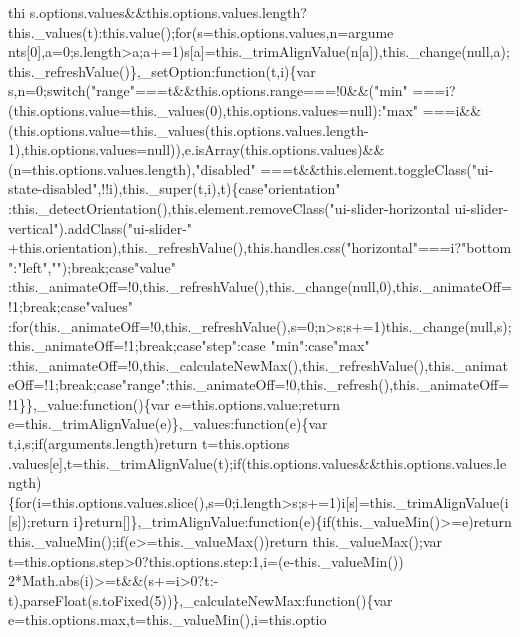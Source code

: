 \begin{DoxyCode}
{       thi
      s.options.values&&this.options.values.length?this.\_values(t):this.value();for(s=this.options.values,n=argume
      nts[0],a=0;s.length>a;a+=1)s[a]=this.\_trimAlignValue(n[a]),this.\_change(null,a);this.\_refreshValue()\},\_setOption:function(t,i)\{var s,n=0;switch("}range\textcolor{stringliteral}{"===t&&this.options.range===!0&&("}min\textcolor{stringliteral}{"
      ===i?(this.options.value=this.\_values(0),this.options.values=null):"}max\textcolor{stringliteral}{"
      ===i&&(this.options.value=this.\_values(this.options.values.length-1),this.options.values=null)),e.isArray(this.options.values)&&(n=this.options.values.length),"}disabled\textcolor{stringliteral}{"
      ===t&&this.element.toggleClass("}ui-state-disabled\textcolor{stringliteral}{",!!i),this.\_super(t,i),t)\{case"}orientation\textcolor{stringliteral}{"
      :this.\_detectOrientation(),this.element.removeClass("}ui-slider-horizontal ui-slider-vertical\textcolor{stringliteral}{").addClass("}ui-slider-\textcolor{stringliteral}{"
      +this.orientation),this.\_refreshValue(),this.handles.css("}horizontal\textcolor{stringliteral}{"===i?"}bottom\textcolor{stringliteral}{":"}left\textcolor{stringliteral}{","}\textcolor{stringliteral}{");break;case"}value\textcolor{stringliteral}{"
      :this.\_animateOff=!0,this.\_refreshValue(),this.\_change(null,0),this.\_animateOff=!1;break;case"}values\textcolor{stringliteral}{"
      :for(this.\_animateOff=!0,this.\_refreshValue(),s=0;n>s;s+=1)this.\_change(null,s);this.\_animateOff=!1;break;case"}step\textcolor{stringliteral}{":case
      "}min\textcolor{stringliteral}{":case"}max\textcolor{stringliteral}{"
      :this.\_animateOff=!0,this.\_calculateNewMax(),this.\_refreshValue(),this.\_animateOff=!1;break;case"}range\textcolor{stringliteral}{":this.\_animateOff=!0,this.\_refresh(),this.\_animateOff=!1\}\},\_value:function()\{var
       e=this.options.value;return e=this.\_trimAlignValue(e)\},\_values:function(e)\{var t,i,s;if(arguments.length)return
       t=this.options
      .values[e],t=this.\_trimAlignValue(t);if(this.options.values&&this.options.values.length)\{for(i=this.options.values.slice(),s=0;i.length>s;s+=1)i[s]=this.\_trimAlignValue(i[s]);return
       i\}return[]\},\_trimAlignValue:function(e)\{if(this.\_valueMin()>=e)return this.\_valueMin();if(e>=this.\_valueMax())return this.\_valueMax();var
       t=this.options.step>0?this.options.step:1,i=(e-this.\_valueMin())%
       2*Math.abs(i)>=t&&(s+=i>0?t:-t),parseFloat(s.toFixed(5))\},\_calculateNewMax:function()\{var
       e=this.options.max,t=this.\_valueMin(),i=this.optio
}
\end{DoxyCode}
